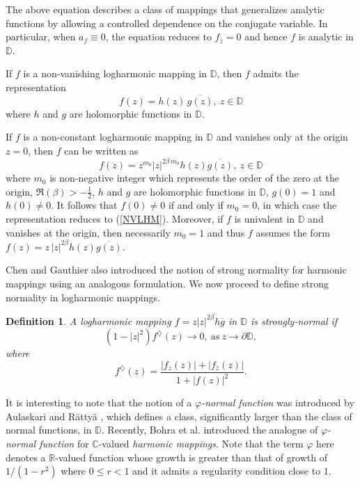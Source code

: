 \documentclass[10pt,a4paper]{amsart}
\newtheorem{definition}[theorem]{Definition}
\numberwithin{equation}{section}
\begin{document}
The above equation describes a class of mappings that generalizes analytic functions by allowing a 
controlled dependence on the conjugate variable. In particular, when $a_f \equiv 0$, 
the equation reduces to $f_{\bar z} = 0$ and hence $f$ is analytic in $\mathbb D$.
\smallskip

If $f$ is a non-vanishing logharmonic mapping in $\mathbb D$, then $f$ admits the representation
\begin{equation*}
f(z) = h(z)\,\overline{g(z)},\ z\in\mathbb D\tag{ii} \label{NVLHM}
\end{equation*}
where $h$ and $g$ are holomorphic functions in $\mathbb D$. \smallskip

If $f$ is a non-constant logharmonic mapping in $\mathbb D$ and vanishes only at the origin $z=0$, then $f$ can be written as
\begin{equation*}
f(z) = z^{m_0} |z|^{2\beta\,m_0} h(z)\overline{g(z)},\ z\in\mathbb D \tag{iii} \label{VLHM}
\end{equation*}
where $m_0$ is non-negative integer which represents the order of the zero at the origin, $\Re(\beta) > -\tfrac{1}{2}$,
$h$ and $g$ are holomorphic functions in $\mathbb D$, $g(0) = 1$ and $h(0) \neq 0$. 
It follows that $f(0) \neq 0$ if and only if $m_0 = 0$, in which case the representation reduces to 
(\ref{NVLHM}). Moreover, if $f$ is univalent in $\mathbb D$ and vanishes at the origin, then 
necessarily $m_0 = 1$ and thus $f$ assumes the form
$
f(z) = z\,|z|^{2\beta} h(z)\overline{g(z)}.
$\smallskip

Chen and Gauthier \cite{chen-osnf-1996} also introduced the notion of strong normality for harmonic mappings using an 
analogous formulation. We now proceed to define strong normality in logharmonic mappings. 
\begin{definition}
A logharmonic mapping $f=z|z|^{2\beta}h\overline{g}$ in $\mathbb{D}$ is \emph{strongly-normal} if \begin{equation*}(1-|z|^2)f^\diamondsuit(z)\to0,\ \text{as}\ z\to\partial\mathbb D,\end{equation*}
where \begin{equation*}f^\diamondsuit(z)=\dfrac{|f_z(z)|+|f_{\overline{z}}(z)|}{1+|f(z)|^2}.\end{equation*}
\end{definition}
It is interesting to note that the notion of a \emph{$\varphi$-normal function} was introduced by 
Aulaskari and R\"atty\"a \cite{aulaskari-pompnf-2011}, which defines a class,
significantly larger than the class of normal functions, in $\mathbb{D}$. Recently, Bohra et al. 
\cite{bohra-lfptfpnhm-2025} introduced the analogue of \emph{$\varphi$-normal function} 
for $\mathbb C$-valued \emph{harmonic mappings}. Note that the term $\varphi$ here denotes a $\mathbb R$-valued 
function whose growth is greater than that of growth of $1/(1-r^2)$ where $0\leq r<1$ and it admits a regularity condition close to $1$. \smallskip
\end{document}
